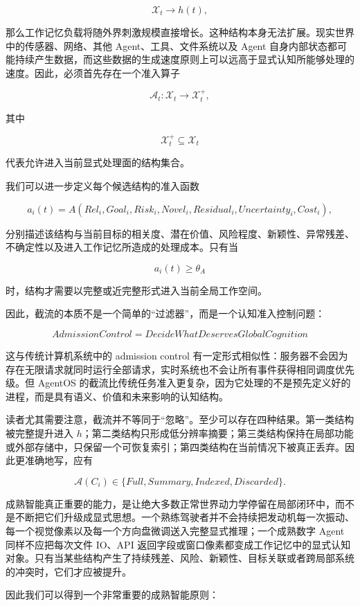 \[
\mathcal X_t
\rightarrow
h(t),
\]

那么工作记忆负载将随外界刺激规模直接增长。这种结构本身无法扩展。现实世界中的传感器、网络、其他 Agent、工具、文件系统以及 Agent 自身内部状态都可能持续产生数据，而这些数据的生成速度原则上可以远高于显式认知所能够处理的速度。因此，必须首先存在一个准入算子

\[
\mathcal A_t:
\mathcal X_t
\rightarrow
\mathcal X_t^{+},
\]

其中

\[
\mathcal X_t^{+}
\subseteq
\mathcal X_t
\]

代表允许进入当前显式处理面的结构集合。

我们可以进一步定义每个候选结构的准入函数

\[
a_i(t)
=
A
\left(
Rel_i,
Goal_i,
Risk_i,
Novel_i,
Residual_i,
Uncertainty_i,
Cost_i
\right),
\]

分别描述该结构与当前目标的相关度、潜在价值、风险程度、新颖性、异常残差、不确定性以及进入工作记忆所造成的处理成本。只有当

\[
a_i(t)
\geq
\theta_A
\]

时，结构才需要以完整或近完整形式进入当前全局工作空间。

因此，截流的本质不是一个简单的“过滤器”，而是一个认知准入控制问题：

\[
\boxed{
AdmissionControl
=
DecideWhatDeservesGlobalCognition
}
\]

这与传统计算机系统中的 admission control 有一定形式相似性：服务器不会因为存在无限请求就同时运行全部请求，实时系统也不会让所有事件获得相同调度优先级。但 AgentOS 的截流比传统任务准入更复杂，因为它处理的不是预先定义好的进程，而是具有语义、价值和未来影响的认知结构。

读者尤其需要注意，截流并不等同于“忽略”。至少可以存在四种结果。第一类结构被完整提升进入 $h$；第二类结构只形成低分辨率摘要；第三类结构保持在局部功能或外部存储中，只保留一个可恢复索引；第四类结构在当前情况下被真正丢弃。因此更准确地写，应有

\[
\mathcal A(C_i)
\in
\{
Full,
Summary,
Indexed,
Discarded
\}.
\]

成熟智能真正重要的能力，是让绝大多数正常世界动力学停留在局部闭环中，而不是不断把它们升级成显式思想。一个熟练驾驶者并不会持续把发动机每一次振动、每一个视觉像素以及每一个方向盘微调送入完整显式推理；一个成熟数字 Agent 同样不应把每次文件 IO、API 返回字段或窗口像素都变成工作记忆中的显式认知对象。只有当某些结构产生了持续残差、风险、新颖性、目标关联或者跨局部系统的冲突时，它们才应被提升。

因此我们可以得到一个非常重要的成熟智能原则：

